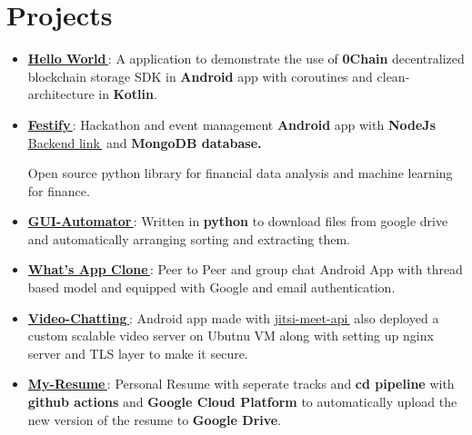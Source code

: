 \documentclass[letterpaper,11pt]{article}
\let\orighref\href
\renewcommand{\href}[2]{\orighref{#1}{#2\,\faExternalLink}}
\newcommand{\resumeItem}[2]{
  \item\small{
    \textbf{#1}{: #2 \vspace{-2pt}}
  }
}
\newcommand{\resumeSubHeadingListStart}{\begin{itemize}[leftmargin=*]}
\newcommand{\resumeSubHeadingListEnd}{\end{itemize}}
\begin{document}

\section{Projects}
\resumeSubHeadingListStart
\resumeItem{\href{https://github.com/0chain/HelloWorld-Android}{Hello World}}{A application to demonstrate the use of \textbf{0Chain} decentralized blockchain storage SDK in \textbf{Android} app with coroutines and clean-architecture in \textbf{Kotlin}.}
\resumeItem{\href{https://github.com/yash10019coder/festify-android}{Festify}}{Hackathon and event management \textbf{Android} app with \textbf{NodeJs} \href{https://github.com/yash10019coder/festify-node-server}{Backend link} and \textbf{MongoDB database.}}
{Open source python library for financial data analysis and machine learning for finance.}
\resumeItem{\href{https://github.com/yash10019coder/Gui-Automator}{GUI-Automator}}
{Written in \textbf{python} to download files from google drive and automatically arranging sorting and extracting them.}
\resumeItem{\href{https://github.com/yash10019coder/Whats-App}{What's App Clone}}
{Peer to Peer and group chat Android App with thread based model and equipped with Google and email authentication.}
\resumeItem{\href{https://github.com/yash10019coder/Video-Chatting}{Video-Chatting}}
{Android app made with \href{https://github.com/jitsi/jitsi-meet}{jitsi-meet-api} also deployed a custom scalable video server on Ubutnu VM along with setting up nginx server and TLS layer to make it secure.}
\resumeItem{\href{https://github.com/yash10019coder/resume}{My-Resume}}{Personal Resume with seperate tracks and \textbf{cd pipeline} with \textbf{github actions} and \textbf{Google Cloud Platform} to automatically upload the new version of the resume to \textbf{Google Drive}.}
\resumeSubHeadingListEnd
\end{document}
